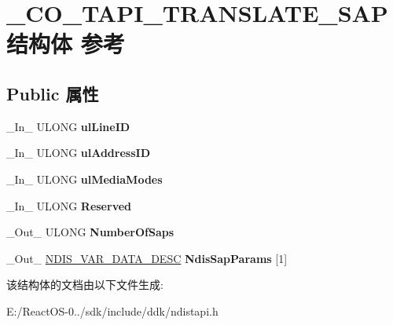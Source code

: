 \hypertarget{struct___c_o___t_a_p_i___t_r_a_n_s_l_a_t_e___s_a_p}{}\section{\+\_\+\+C\+O\+\_\+\+T\+A\+P\+I\+\_\+\+T\+R\+A\+N\+S\+L\+A\+T\+E\+\_\+\+S\+A\+P结构体 参考}
\label{struct___c_o___t_a_p_i___t_r_a_n_s_l_a_t_e___s_a_p}
\subsection*{Public 属性}
\begin{DoxyCompactItemize}
\item 
\mbox{\label{struct___c_o___t_a_p_i___t_r_a_n_s_l_a_t_e___s_a_p_a5910adb6e723aeb6230a63c516647559}} 
\+\_\+\+In\+\_\+ U\+L\+O\+NG {\bfseries ul\+Line\+ID}
\item 
\mbox{\label{struct___c_o___t_a_p_i___t_r_a_n_s_l_a_t_e___s_a_p_a6cc68511929ab095cae499bb41ee2346}} 
\+\_\+\+In\+\_\+ U\+L\+O\+NG {\bfseries ul\+Address\+ID}
\item 
\mbox{\label{struct___c_o___t_a_p_i___t_r_a_n_s_l_a_t_e___s_a_p_a9359dbc9573e4045ff13163984553457}} 
\+\_\+\+In\+\_\+ U\+L\+O\+NG {\bfseries ul\+Media\+Modes}
\item 
\mbox{\label{struct___c_o___t_a_p_i___t_r_a_n_s_l_a_t_e___s_a_p_a3dbdd5975b4bf04b078344bb61131934}} 
\+\_\+\+In\+\_\+ U\+L\+O\+NG {\bfseries Reserved}
\item 
\mbox{\label{struct___c_o___t_a_p_i___t_r_a_n_s_l_a_t_e___s_a_p_a9ecc2e78e1ef03d3d597abff3527ecc4}} 
\+\_\+\+Out\+\_\+ U\+L\+O\+NG {\bfseries Number\+Of\+Saps}
\item 
\mbox{\label{struct___c_o___t_a_p_i___t_r_a_n_s_l_a_t_e___s_a_p_a3481194272defaed210fa2a8d7fbbd91}} 
\+\_\+\+Out\+\_\+ \hyperlink{struct___n_d_i_s___v_a_r___d_a_t_a___d_e_s_c}{N\+D\+I\+S\+\_\+\+V\+A\+R\+\_\+\+D\+A\+T\+A\+\_\+\+D\+E\+SC} {\bfseries Ndis\+Sap\+Params} \mbox{[}1\mbox{]}
\end{DoxyCompactItemize}


该结构体的文档由以下文件生成\+:\begin{DoxyCompactItemize}
\item 
E\+:/\+React\+O\+S-\/0../sdk/include/ddk/ndistapi.\+h\end{DoxyCompactItemize}
